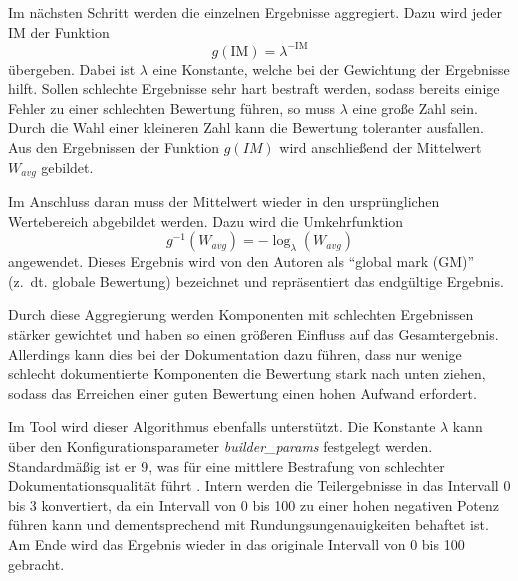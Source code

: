  Im nächsten Schritt werden die einzelnen Ergebnisse aggregiert. Dazu wird jeder IM der Funktion
 \begin{equation}
     g(\text{IM})=\lambda^{-\text{IM}}
 \end{equation} übergeben. Dabei ist $\lambda$ eine Konstante, welche bei der Gewichtung der Ergebnisse hilft. Sollen schlechte Ergebnisse sehr hart bestraft werden, sodass bereits einige Fehler zu einer schlechten Bewertung führen, so muss $\lambda$ eine große Zahl sein. Durch die Wahl einer kleineren Zahl kann die Bewertung toleranter ausfallen. Aus den Ergebnissen der Funktion $g(IM)$ wird anschließend der Mittelwert $W_{avg}$ gebildet.
 
 Im Anschluss daran muss der Mittelwert wieder in den ursprünglichen Wertebereich abgebildet werden. Dazu wird die Umkehrfunktion
 \begin{equation}
     g^{-1}(W_{avg})=-\log_\lambda (W_{avg})
 \end{equation} angewendet. Dieses Ergebnis wird von den Autoren als \enquote{global mark (GM)} (z.~dt. globale Bewertung) bezeichnet und repräsentiert das endgültige Ergebnis.
 
 Durch diese Aggregierung werden Komponenten mit schlechten Ergebnissen stärker gewichtet und haben so einen größeren Einfluss auf das Gesamtergebnis. Allerdings kann dies bei der Dokumentation dazu führen, dass nur wenige schlecht dokumentierte Komponenten die Bewertung stark nach unten ziehen, sodass das Erreichen einer guten Bewertung einen hohen Aufwand erfordert. 
 
 Im Tool wird dieser Algorithmus ebenfalls unterstützt. Die Konstante $\lambda$ kann über den Konfigurationsparameter \textit{builder\_params} festgelegt werden. Standardmäßig ist er 9, was für eine mittlere Bestrafung von schlechter Dokumentationsqualität führt \cite[S.~1127]{Softwarequalitymetricsaggregationinindustry}. Intern werden die Teilergebnisse in das Intervall 0 bis 3 konvertiert, da ein Intervall von 0 bis 100 zu einer hohen negativen Potenz führen kann und dementsprechend mit Rundungsungenauigkeiten behaftet ist. Am Ende wird das Ergebnis wieder in das originale Intervall von 0 bis 100 gebracht. 
 
 
 

 
 